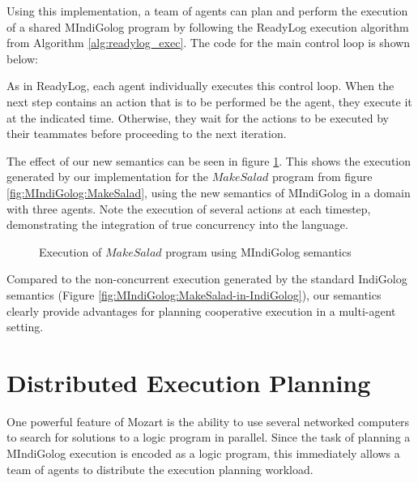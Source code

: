 
Using this implementation, a team of agents can plan and perform the
execution of a shared MIndiGolog program by following the ReadyLog
execution algorithm from Algorithm \ref{alg:readylog_exec}. The code
for the main control loop is shown below:


As in ReadyLog, each agent individually executes this control loop.
When the next step contains an action that is to be performed be the
agent, they execute it at the indicated time. Otherwise, they wait for the actions to be executed by their teammates before proceeding to the next iteration.


The effect of our new semantics can be seen in figure \ref{fig:MIndiGolog:MakeSalad-in-MIndiGolog}.
This shows the execution generated by our implementation for the $MakeSalad$
program from figure \ref{fig:MIndiGolog:MakeSalad}, using the new
semantics of MIndiGolog in a domain with three agents. Note the execution
of several actions at each timestep, demonstrating the integration
of true concurrency into the language.

%
\begin{figure}

\caption{Execution of $MakeSalad$ program using MIndiGolog semantics\label{fig:MIndiGolog:MakeSalad-in-MIndiGolog}}

\end{figure}


Compared to the non-concurrent execution generated by the standard
IndiGolog semantics (Figure \ref{fig:MIndiGolog:MakeSalad-in-IndiGolog}),
our semantics clearly provide advantages for planning cooperative execution
in a multi-agent setting.


\section{Distributed Execution Planning\label{sec:MIndiGolog:Distributed-Planning}}

One powerful feature of Mozart is the ability to use several networked
computers to search for solutions to a logic program in parallel.
Since the task of planning a MIndiGolog execution is encoded as a
logic program, this immediately allows a team of agents to distribute
the execution planning workload.

